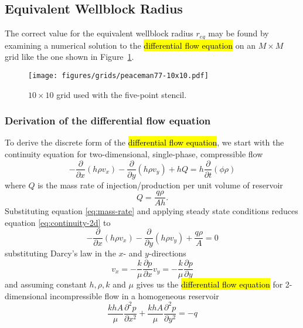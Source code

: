 \subsection{Equivalent Wellblock Radius} %
\label{sub:equivalent_wellblock_radius}
The correct value for the equivalent wellblock radius $r_{eq}$ may be found by examining a numerical solution to the \hl{differential flow equation} on an $M\times M$ grid like the one shown in Figure~\ref{fig:peaceman-grid}. 

\begin{figure}[htbp]
    \centering
    \texttt{[image: figures/grids/peaceman77-10x10.pdf]}
    \caption{$10\times 10$ grid used with the five-point stencil.}
    \label{fig:peaceman-grid}
\end{figure}

\subsubsection{Derivation of the differential flow equation} %
\label{ssub:derivation}
To derive the discrete form of the \hl{differential flow equation}, we  start with the continuity equation for two-dimensional, single-phase, compressible flow \cite{Peaceman1977Fundamentals}
\begin{equation}
    \label{eq:continuity-2d}
    - \frac{\partial}{\partial x} \left( h\rho v_x \right) - \frac{\partial}{\partial y} \left( h\rho v_y \right) + hQ = h \frac{\partial }{\partial t} \left( \phi \rho \right)
\end{equation}
where $Q$ is the mass rate of injection/production per unit volume of reservoir
\begin{equation}
    \label{eq:mass-rate}
    Q = \frac{q\rho}{Ah}.
\end{equation}
Substituting equation \eqref{eq:mass-rate} and applying steady state conditions reduces equation \eqref{eq:continuity-2d} to
\begin{equation}
    - \frac{\partial}{\partial x} \left( h\rho v_x \right) - \frac{\partial}{\partial y} \left( h\rho v_y \right) + \frac{q\rho}{A} = 0
\end{equation}
substituting Darcy's law in the $x$- and $y$-directions \cite{Peaceman1977Fundamentals}
\begin{subequations}
    \begin{equation}
        v_x = -\frac{k}{\mu} \frac{\partial p}{\partial x}
    \end{equation}
    \begin{equation}
        v_y = -\frac{k}{\mu} \frac{\partial p}{\partial y}
    \end{equation}
\end{subequations}
and assuming constant $h,\rho,k$ and $\mu$ gives us the \hl{differential flow equation} for 2-dimensional incompressible flow in a homogeneous reservoir
\begin{equation}
    \label{eq:differential-flow}
    \frac{khA}{\mu} \frac{\partial^2 p}{\partial x^2}  + \frac{khA}{\mu} \frac{\partial^2 p}{\partial y^2} = -q
\end{equation}

